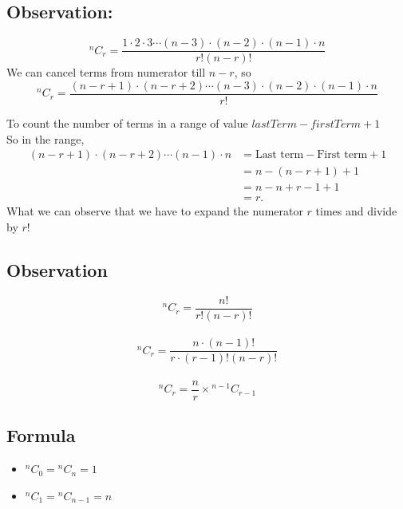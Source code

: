 \subsection{Observation: }
\[
{}^{n}C_{r} = \frac{1\cdot2\cdot3\cdots(n-3)\cdot(n-2)\cdot(n-1)\cdot n}{r!(n-r)!}
\]
We can cancel terms from numerator till $n-r$, so\\
\[
{}^{n}C_{r} = \frac{(n-r+1)\cdot(n-r+2)\cdots(n-3)\cdot(n-2)\cdot(n-1)\cdot n}{r!}
\]

To count the number of terms in a range of value $lastTerm-firstTerm+1$\\
So in the range, 
\[
\begin{aligned}
(n-r+1)\cdot(n-r+2)\cdots(n-1)\cdot n 
&= \text{Last term} - \text{First term} + 1 \\
&= n - (n-r+1) + 1 \\
&= n - n + r - 1 + 1 \\
&= r.
\end{aligned}
\]
What we can observe that we have to expand the numerator $r$ times and divide by $r!$

\subsection{Observation}
\[
{}^{n}C_{r} = \frac{n!}{r!(n-r)!}
\]\\
\[
{}^{n}C_{r} = \frac{n\cdot(n-1)!}{r\cdot(r-1)!(n-r)!}
\]\\
\[
\boxed{
{}^{n}C_{r} = \frac{n}{r}\times {}^{n-1}C_{r-1} 
}
\]

\subsection{Formula}
\begin{itemize}
    \item $\boxed{{}^{n}C_{0}= {}^{n}C_{n}=1}$
    \item $\boxed{{}^{n}C_{1}={}^{n}C_{n-1}= n}$
\end{itemize}